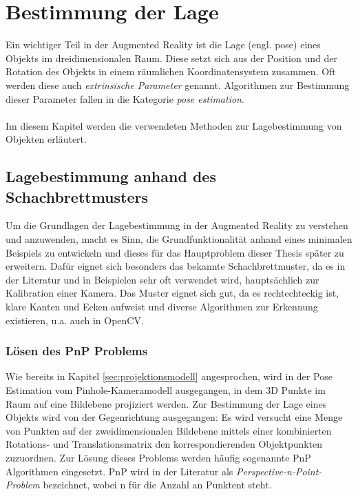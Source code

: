 \chapter{Bestimmung der Lage}
\label{chap:projektion}

Ein wichtiger Teil in der Augmented Reality ist die Lage (engl. pose) eines Objekts im dreidimensionalen Raum. Diese setzt sich aus der Position und der Rotation des Objekts in einem räumlichen Koordinatensystem zusammen. Oft werden diese auch \textit{extrinsische Parameter} genannt. Algorithmen zur Bestimmung dieser Parameter fallen in die Kategorie \textit{pose estimation}.
\\
\\
Im diesem Kapitel werden die verwendeten Methoden zur Lagebestimmung von Objekten erläutert.


\section{Lagebestimmung anhand des Schachbrettmusters}


Um die Grundlagen der Lagebestimmung in der Augmented Reality zu verstehen und anzuwenden, macht es Sinn, die Grundfunktionalität anhand eines minimalen Beispiels zu entwickeln und dieses für das Hauptproblem dieser Thesis später zu erweitern. Dafür eignet sich besonders das bekannte Schachbrettmuster, da es in der Literatur und in Beispielen sehr oft verwendet wird, hauptsächlich zur Kalibration einer Kamera. Das Muster eignet sich gut, da es rechtechteckig ist, klare Kanten und Ecken aufweist und diverse Algorithmen zur Erkennung existieren, u.a. auch in OpenCV.

\subsection{Lösen des PnP Problems}

Wie bereits in Kapitel \ref{sec:projektionsmodell} angesprochen, wird in der Pose Estimation vom Pinhole-Kameramodell ausgegangen, in dem 3D Punkte im Raum auf eine Bildebene projiziert werden. Zur Bestimmung der Lage eines Objekts wird von der Gegenrichtung ausgegangen: Es wird versucht eine Menge von Punkten auf der zweidimensionalen Bildebene mittels einer kombinierten Rotations- und Translationsmatrix den korrespondierenden Objektpunkten zuzuordnen. Zur Lösung dieses Problems werden häufig sogenannte PnP Algorithmen eingesetzt. PnP wird in der Literatur als \textit{Perspective-n-Point-Problem} bezeichnet, wobei n für die Anzahl an Punktent steht. 

